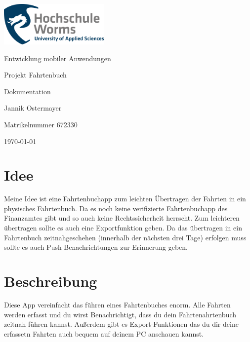 \documentclass[a4paper]{article}
\author{Jannik Ostermayer}
\begin{document}
\pagestyle{scrheadings}         %
\clearpairofpagestyles          %
\ofoot{\pagemark}

\begin{titlepage}

	\centering
	\includegraphics[width=0.4\textwidth]{Logo_HS_Worms.png}\par\vspace{1cm}
	{\LARGE Entwicklung mobiler Anwendungen \par}
	\vspace{1.5cm}
	{\huge Projekt Fahrtenbuch\par}
	\vspace{0.3cm}
	{\huge Dokumentation\par}
	\vspace{2cm}
	{\Large Jannik Ostermayer\par}
	\vspace{1cm}
	{ Matrikelnummer 672330 \par}
	\vfill

	{\large \today\par}

\end{titlepage}

\tableofcontents    %
\pagebreak                              %

\section{Idee}
Meine Idee ist eine Fahrtenbuchapp zum leichten Übertragen 
der Fahrten in ein physisches Fahrtenbuch.
Da es noch keine verifizierte Fahrtenbuchapp 
des Finanzamtes gibt und so auch keine Rechtssicherheit herrscht.
Zum leichteren übertragen sollte es auch eine Exportfunktion geben.
Da das übertragen in ein Fahrtenbuch zeitnahgeschehen (innerhalb der 
nächsten drei Tage) erfolgen muss sollte es auch Push Benachrichtungen
zur Erinnerung geben. 

\section{Beschreibung}
Diese App vereinfacht das führen eines Fahrtenbuches enorm. 
Alle Fahrten werden erfasst und du wirst Benachrichtigt, dass du dein 
Fahrtenahrtenbuch zeitnah führen kannst. 
Außerdem gibt es Export-Funktionen das du dir deine erfassetn Fahrten 
auch bequem auf deinem PC anschauen kannst.
\end{document}
